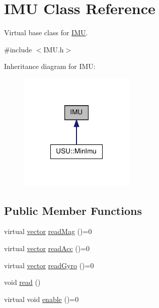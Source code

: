 \hypertarget{class_i_m_u}{\section{\-I\-M\-U \-Class \-Reference}
\label{class_i_m_u}
}


\-Virtual base class for \hyperlink{class_i_m_u}{\-I\-M\-U}.  




{\ttfamily \#include $<$\-I\-M\-U.\-h$>$}



\-Inheritance diagram for \-I\-M\-U\-:\nopagebreak
\begin{figure}[H]
\begin{center}
\leavevmode
\includegraphics[width=156pt]{class_i_m_u__inherit__graph}
\end{center}
\end{figure}
\subsection*{\-Public \-Member \-Functions}
\begin{DoxyCompactItemize}
\item 
virtual \hyperlink{vector_8h_a148efcf3c5319dd8961dbf9f4b846a98}{vector} \hyperlink{class_i_m_u_a52359006a1ca04d0b1852f374a476f91}{read\-Mag} ()=0
\item 
virtual \hyperlink{vector_8h_a148efcf3c5319dd8961dbf9f4b846a98}{vector} \hyperlink{class_i_m_u_a2928cc8a1fc13464ef90da96fd9358b7}{read\-Acc} ()=0
\item 
virtual \hyperlink{vector_8h_a148efcf3c5319dd8961dbf9f4b846a98}{vector} \hyperlink{class_i_m_u_a887a00b7e1c998a65ee42b021b59d84c}{read\-Gyro} ()=0
\item 
void \hyperlink{class_i_m_u_a1de4cb31f28f71d7cc8b1546ea59b4ab}{read} ()
\item 
virtual void \hyperlink{class_i_m_u_a58899f2357a00a4d1f3b892b879e1e92}{enable} ()=0
\end{DoxyCompactItemize}
